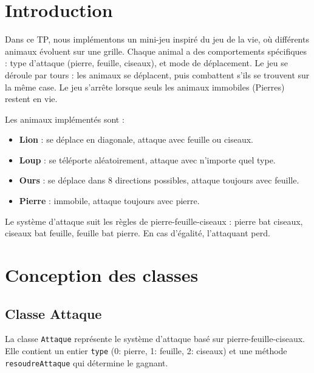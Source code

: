 \documentclass[a4paper,12pt,french]{article}
\begin{document}

\section{Introduction}

Dans ce TP, nous implémentons un mini-jeu inspiré du jeu de la vie, où différents animaux évoluent sur une grille. Chaque animal a des comportements spécifiques : type d'attaque (pierre, feuille, ciseaux), et mode de déplacement. Le jeu se déroule par tours : les animaux se déplacent, puis combattent s'ils se trouvent sur la même case. Le jeu s'arrête lorsque seuls les animaux immobiles (Pierres) restent en vie.

Les animaux implémentés sont :
\begin{itemize}
  \item \textbf{Lion} : se déplace en diagonale, attaque avec feuille ou ciseaux.
  \item \textbf{Loup} : se téléporte aléatoirement, attaque avec n'importe quel type.
  \item \textbf{Ours} : se déplace dans 8 directions possibles, attaque toujours avec feuille.
  \item \textbf{Pierre} : immobile, attaque toujours avec pierre.
\end{itemize}

Le système d'attaque suit les règles de pierre-feuille-ciseaux : pierre bat ciseaux, ciseaux bat feuille, feuille bat pierre. En cas d'égalité, l'attaquant perd.


\pagebreak
\section{Conception des classes}

\subsection{Classe Attaque}

La classe \texttt{Attaque} représente le système d'attaque basé sur pierre-feuille-ciseaux. Elle contient un entier \texttt{type} (0: pierre, 1: feuille, 2: ciseaux) et une méthode \texttt{resoudreAttaque} qui détermine le gagnant.
\end{document}

